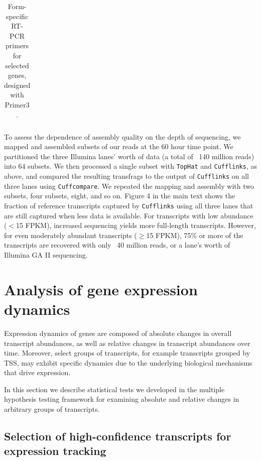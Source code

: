 \documentclass[12pt]{amsart}
\theoremstyle{definition}
\begin{document}
\begin{table}[h]
{\begin{tabular}{r|l|c|c}
    \end{tabular}
    }
\caption[Form-specific RT-PCR primers for selected genes]{Form-specific RT-PCR primers for selected genes, designed with Primer3 \cite{Rozen2000}. \label{RT-PCR_primers}}
\end{table}


To assess the dependence of assembly quality on the depth of sequencing, we
mapped and assembled subsets of our reads at the 60 hour time point. We
partitioned the three Illumina lanes' worth of data (a total of ~140 million
reads) into 64 subsets. We then processed a single subset with {\tt TopHat}
and {\tt Cufflinks}, as above, and compared the resulting transfrags to the
output of {\tt Cufflinks} on all three lanes using {\tt Cuffcompare}. We
repeated the mapping and assembly with two subsets, four subsets, eight, and
so on. Figure 4 in the main text shows the fraction of reference transcripts
captured by {\tt Cufflinks} using all three lanes that are still captured when
less data is available. For transcripts with low abundance ($<$15
FPKM), increased sequencing yields more full-length transcripts. However, for
even moderately abundant transcripts ($\geq$15 FPKM), 75\% or more of
the transcripts are recovered with only ~40 million reads, or a lane's worth
of Illumina GA II sequencing.

\section{Analysis of gene expression dynamics}

Expression dynamics of genes are composed of absolute changes in
overall transcript abundances, as well as relative changes in
transcript abundances over time. Moreover, select groups of
transcripts, for example transcripts grouped by TSS, may exhibit
specific dynamics due to the underlying biological mechanisms that
drive expression.

In this section we describe statistical tests we developed in the
multiple hypothesis testing framework for examining absolute and
relative changes in arbitrary groups of transcripts.

\subsection{Selection of high-confidence transcripts for expression tracking}
\end{document}
